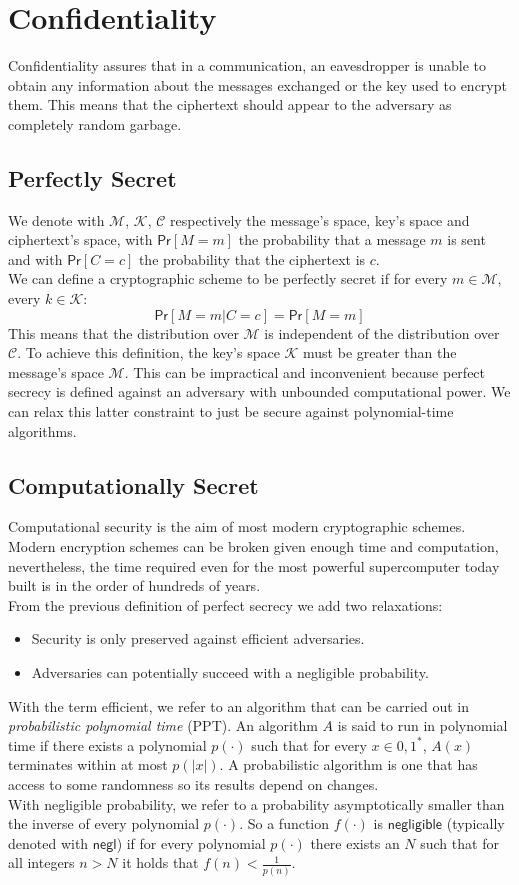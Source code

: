 \section{Confidentiality}
Confidentiality assures that in a communication, an eavesdropper is unable to obtain any information about the messages exchanged or the key used to encrypt them. This means that the ciphertext should appear to the adversary as completely random garbage.
\subsection{Perfectly Secret}
We denote with $\mathcal{M}$, $\mathcal{K}$, $\mathcal{C}$ respectively the message's space, key's space and ciphertext's space, with $\mathsf{Pr}[M = m]$ the probability that a message $m$ is sent and with $\mathsf{Pr}[C = c]$ the probability that the ciphertext is $c$.\\
We can define a cryptographic scheme to be perfectly secret if for every $m \in \mathcal{M}$, every $k \in \mathcal{K}$:
$$
    \mathsf{Pr}[M = m | C = c] = \mathsf{Pr}[M = m]
$$
This means that the distribution over $\mathcal{M}$ is independent of the distribution over $\mathcal{C}$.
To achieve this definition, the key's space $\mathcal{K}$ must be greater than the message's space $\mathcal{M}$. This can be impractical and inconvenient because perfect secrecy is defined against an adversary with unbounded computational power. We can relax this latter constraint to just be secure against polynomial-time algorithms.

\subsection{Computationally Secret}
Computational security is the aim of most modern cryptographic schemes. Modern encryption schemes can be broken given enough time and computation, nevertheless, the time required even for the most powerful supercomputer today built is in the order of hundreds of years.\\
From the previous definition of perfect secrecy we add two relaxations:
\begin{itemize}
    \item{Security is only preserved against efficient adversaries.}
    \item{Adversaries can potentially succeed with a negligible probability.}
\end{itemize}
With the term efficient, we refer to an algorithm that can be carried out in \emph{probabilistic polynomial time} (PPT). An algorithm $\mathit{A}$ is said to run in polynomial time if there exists a polynomial $p(\cdot)$ such that for every $x \in {0, 1}^*$, $\mathit{A}(x)$ terminates within at most $p(|x|)$. A probabilistic algorithm is one that has access to some randomness so its results depend on changes.\\
With negligible probability, we refer to a probability asymptotically smaller than the inverse of every polynomial $p(\cdot)$.
So a function $f(\cdot)$ is $\mathsf{negligible}$ (typically denoted with $\mathsf{negl}$) if for every polynomial $p(\cdot)$ there exists an $N$ such that for all integers $n > N$ it holds that $f(n) < \frac{1}{p(n)}$.

